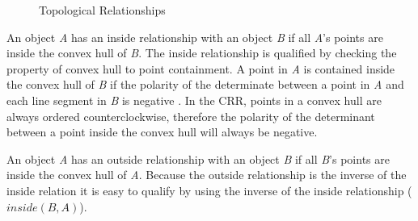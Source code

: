 \documentclass[12pt]{ucthesis}
\begin{document}
\begin{figure}[b]
 \centering
 \hspace{4 mm}
  \hspace{4 mm}
 \hspace{2 mm}
 \caption{Topological Relationships}
\label{topoloy}
\end{figure}

An object \emph{A} has an inside relationship with an object \emph{B} if all \emph{A}'s points are inside the convex hull of \emph{B}. The inside relationship is qualified by checking the property of convex hull to point containment. A point in \emph{A} is contained inside the convex hull of \emph{B} if the polarity of the determinate between a point in \emph{A} and each line segment in \emph{B} is negative \cite{compgeom:2000}. In the CRR, points in a convex hull are always ordered counterclockwise, therefore the polarity of the determinant between a point inside the convex hull will always be negative. 

An object \emph{A} has an outside relationship with an object \emph{B} if all \emph{B}'s points are inside the convex hull of \emph{A}. Because the outside relationship is the inverse of the inside relation it is easy to qualify by using the inverse of the inside relationship ($inside(B,A)$). 
\end{document}

